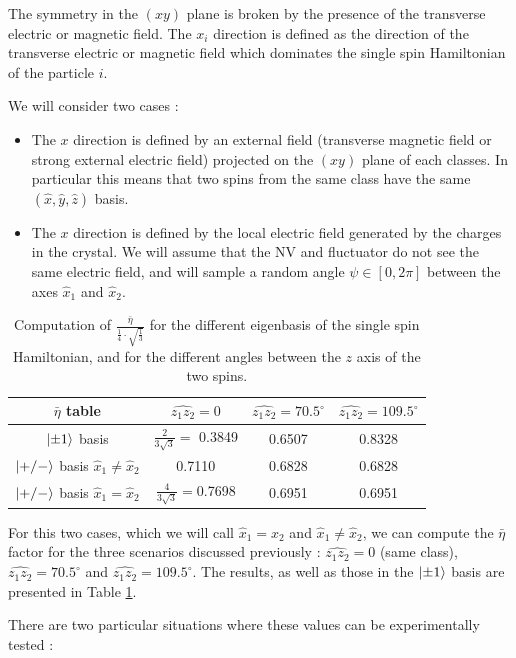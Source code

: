 \documentclass[preprintnumbers,amsmath,amssymb,onecolumn,12pt]{revtex4-2}\usepackage{graphicx}%
\begin{document}
The symmetry in the $(xy)$ plane is broken by the presence of the transverse electric or magnetic field. The $x_i$ direction is defined as the direction of the transverse electric or magnetic field which dominates the single spin Hamiltonian of the particle $i$.

We will consider two cases :
\begin{itemize}
\item The $x$ direction is defined by an external field (transverse magnetic field or strong external electric field) projected on the $(xy)$ plane of each classes. In particular this means that two spins from the same class have the same $(\hat x, \hat y, \hat z)$ basis.
\item The $x$ direction is defined by the local electric field generated by the charges in the crystal. We will assume that the NV and fluctuator do not see the same electric field, and will sample a random angle $\psi \in [0,2\pi]$ between the axes $\hat{x}_1$ and $\hat{x}_2$.
\end{itemize}

\begin{table}
\begin{tabular}{cccc}
\hline
$\bar{\eta}$ table & $\widehat{z_1 z_2}=0$ & $\widehat{z_1 z_2}=70.5^\circ$ & $\widehat{z_1 z_2}=109.5^\circ$ \\
\hline
$\ket{\pm 1}$ basis & $\frac{2}{3\sqrt{3}}=$ 0.3849 & 0.6507 & 0.8328 \\
$\ket{+/-}$ basis $\hat{x}_1\neq \hat{x}_2$ & 0.7110  & 0.6828 & 0.6828 \\
$\ket{+/-}$ basis $\hat{x}_1= \hat{x}_2$ & $\frac{4}{3\sqrt{3}}=$0.7698  & 0.6951 & 0.6951 \\
\hline
\end{tabular}
\caption{Computation of $\frac{\bar{\eta}}{ \frac{1}{4} \cdot \sqrt{\frac{1}{3}}}$ for the different eigenbasis of the single spin Hamiltonian, and for the different angles between the $z$ axis of the two spins.}
\label{table eta}
\end{table}

For this two cases, which we will call $\hat{x}_1=\hat{x}_2$ and $\hat{x}_1\neq \hat{x}_2$, we can compute the $\bar \eta$ factor for the three scenarios discussed previously : $\widehat{z_1 z_2}=0$ (same class), $\widehat{z_1 z_2}=70.5^\circ$ and $\widehat{z_1 z_2}=109.5^\circ$. The results, as well as those in the $\ket{\pm 1}$ basis are presented in Table \ref{table eta}.

There are two particular situations where these values can be experimentally tested :
\end{document}
